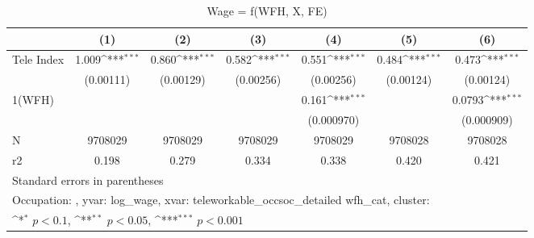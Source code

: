 \begin{table}[htbp]\centering
\def\sym#1{\ifmmode^{#1}\else\(^{#1}\)\fi}
\caption{Wage = f(WFH, X, FE)}
\begin{tabular}{l*{6}{c}}
\hline\hline
                    &\multicolumn{1}{c}{(1)}         &\multicolumn{1}{c}{(2)}         &\multicolumn{1}{c}{(3)}         &\multicolumn{1}{c}{(4)}         &\multicolumn{1}{c}{(5)}         &\multicolumn{1}{c}{(6)}         \\
\hline
Tele Index          &       1.009\sym{***}&       0.860\sym{***}&       0.582\sym{***}&       0.551\sym{***}&       0.484\sym{***}&       0.473\sym{***}\\
                    &   (0.00111)         &   (0.00129)         &   (0.00256)         &   (0.00256)         &   (0.00124)         &   (0.00124)         \\
1(WFH)              &                     &                     &                     &       0.161\sym{***}&                     &      0.0793\sym{***}\\
                    &                     &                     &                     &  (0.000970)         &                     &  (0.000909)         \\
\hline
N                   &     9708029         &     9708029         &     9708029         &     9708029         &     9708028         &     9708028         \\
r2                  &       0.198         &       0.279         &       0.334         &       0.338         &       0.420         &       0.421         \\
\hline\hline
\multicolumn{7}{l}{\footnotesize Standard errors in parentheses}\\
\multicolumn{7}{l}{\footnotesize Occupation: , yvar: log\_wage, xvar: teleworkable\_occsoc\_detailed wfh\_cat, cluster: }\\
\multicolumn{7}{l}{\footnotesize \sym{*} \(p<0.1\), \sym{**} \(p<0.05\), \sym{***} \(p<0.001\)}\\
\end{tabular}
\end{table}
